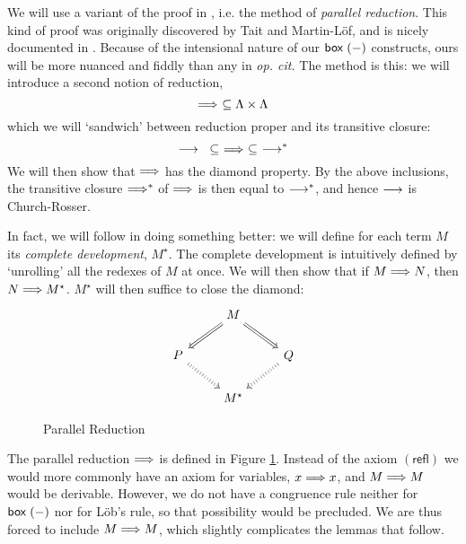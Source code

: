 We will use a variant of the proof in \cite{Kavvos2017b}, i.e.
the method of \emph{parallel reduction}. This kind of proof was
originally discovered by Tait and Martin-L\"of, and is nicely
documented in \cite{Takahashi1995}. Because of the intensional
nature of our $\mathsf{box\;}(-)$ constructs, ours will be more nuanced
and fiddly than any in \emph{op. cit.} The method is this: we will
introduce a second notion of reduction, \[
  \mathrel{\Longrightarrow}\ \subseteq \Lambda \times \Lambda
\] which we will `sandwich' between reduction proper and its
transitive closure: \[
  \red{}\ \subseteq\ \redp\ \subseteq\ \redt
\] We will then show that $\mathrel{\Longrightarrow}$ has the diamond property. By the
above inclusions, the transitive closure $\mathrel{\Longrightarrow}^\ast$ of $\mathrel{\Longrightarrow}$
is then equal to $\mathrel{\longrightarrow^\ast}$, and hence $\mathrel{\longrightarrow}$ is Church-Rosser.

In fact, we will follow \cite{Takahashi1995} in doing something
better: we will define for each term $M$ its \emph{complete
development}, $M^\star$. The complete development is intuitively
defined by `unrolling' all the redexes of $M$ at once. We will
then show that if $M \mathrel{\Longrightarrow} N$, then $N \mathrel{\Longrightarrow} M^\star$. $M^\star$
will then suffice to close the diamond: \[
  \begin{tikzcd}
    & M
	\arrow[dr, Rightarrow]
	\arrow[dl, Rightarrow]
    &  \\
    P
      \arrow[dr, Rightarrow, dotted]
    & 
    & Q 
      \arrow[dl, Rightarrow, dotted] \\
    & M^\star
  \end{tikzcd}
\]

\begin{figure}
  \centering
  \caption{Parallel Reduction}
  \begin{framed}
    
  \end{framed}
  \label{fig:parallel}
\end{figure}

The parallel reduction $\mathrel{\Longrightarrow}$ is defined in Figure
\ref{fig:parallel}. Instead of the axiom $(\textsf{refl})$ we
would more commonly have an axiom for variables, $x \mathrel{\Longrightarrow}{} x$,
and $M \mathrel{\Longrightarrow}{} M$ would be derivable. However, we do not have a
congruence rule neither for $\mathsf{box\;}(-)$ nor for L\"ob's rule, so
that possibility would be precluded. We are thus forced to include
$M \mathrel{\Longrightarrow}{} M$, which slightly complicates the lemmas that follow.

